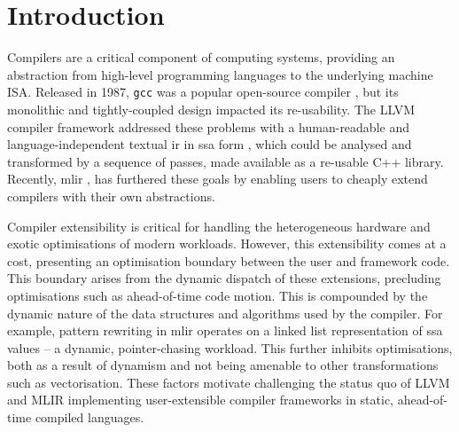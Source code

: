 \chapter{Introduction}
\label{chap:introduction}




Compilers are a critical component of computing systems, providing an abstraction from high-level programming languages to the underlying machine ISA.
Released in 1987, \texttt{gcc} was a popular open-source compiler \cite{stallmanUsingGnuCompiler2009}, but its monolithic and tightly-coupled design impacted its re-usability.
The LLVM compiler framework \cite{lattnerLLVMCompilationFramework2004} addressed these problems with a human-readable and language-independent textual \ac{ir} in \ac{ssa} form \cite{cytronEfficientlyComputingStatic1991}, which could be analysed and transformed by a sequence of passes, made available as a re-usable C++ library.
Recently, \ac{mlir} \cite{lattnerMLIRScalingCompiler2021a}, has furthered these goals by enabling users to cheaply extend compilers with their own abstractions.





Compiler extensibility is critical for handling the heterogeneous hardware and exotic optimisations of modern workloads.
However, this extensibility comes at a cost, presenting an optimisation boundary between the user and framework code. This boundary arises from the dynamic dispatch of these extensions, precluding optimisations such as ahead-of-time code motion.
This is compounded by the dynamic nature of the data structures and algorithms used by the compiler. For example, pattern rewriting in \ac{mlir} operates on a linked list representation of \ac{ssa} values -- a dynamic, pointer-chasing workload.
This further inhibits optimisations, both as a result of dynamism and not being amenable to other transformations such as vectorisation.
These factors motivate challenging the status quo of LLVM and MLIR implementing user-extensible compiler frameworks in static, ahead-of-time compiled languages.






